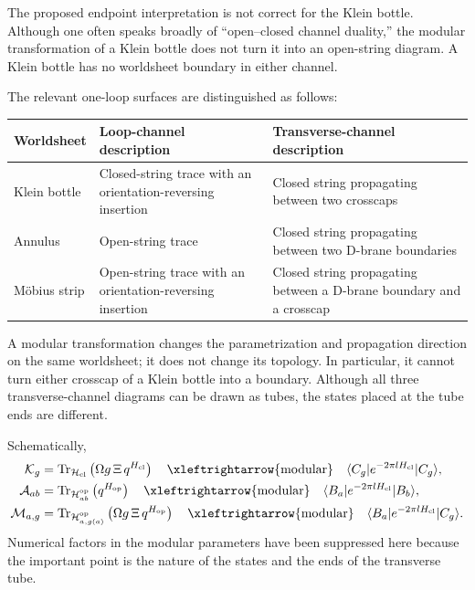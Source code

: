 \documentclass[
  10pt,
  a4paper,
  openany]{book}
\begin{document}
The proposed endpoint interpretation is not correct for the Klein
bottle. Although one often speaks broadly of ``open--closed channel
duality,'' the modular transformation of a Klein bottle does not turn it
into an open-string diagram. A Klein bottle has no worldsheet boundary
in either channel.

The relevant one-loop surfaces are distinguished as follows:

\begin{longtable}[]{@{}
  >{\raggedright\arraybackslash}p{}
  >{\raggedright\arraybackslash}p{}
  >{\raggedright\arraybackslash}p{}@{}}
\toprule\noalign{}
\begin{minipage}[b]{\linewidth}\raggedright
Worldsheet
\end{minipage} & \begin{minipage}[b]{\linewidth}\raggedright
Loop-channel description
\end{minipage} & \begin{minipage}[b]{\linewidth}\raggedright
Transverse-channel description
\end{minipage} \\
\midrule\noalign{}
\endhead
\bottomrule\noalign{}
\endlastfoot
Klein bottle & Closed-string trace with an orientation-reversing
insertion & Closed string propagating between two crosscaps \\
Annulus & Open-string trace & Closed string propagating between two
D-brane boundaries \\
Möbius strip & Open-string trace with an orientation-reversing insertion
& Closed string propagating between a D-brane boundary and a crosscap \\
\end{longtable}

A modular transformation changes the parametrization and propagation
direction on the same worldsheet; it does not change its topology. In
particular, it cannot turn either crosscap of a Klein bottle into a
boundary. Although all three transverse-channel diagrams can be drawn as
tubes, the states placed at the tube ends are different.

Schematically, \[
\begin{aligned}
\mathcal K_g
&=
\operatorname{Tr}_{\mathcal H_{\mathrm{cl}}}
\left(
\Omega g\,\Xi\,q^{H_{\mathrm{cl}}}
\right)
\quad
\xleftrightarrow{\text{modular}}
\quad
\langle C_g|
e^{-2\pi lH_{\mathrm{cl}}}
|C_g\rangle,\\
\mathcal A_{ab}
&=
\operatorname{Tr}_{\mathcal H_{ab}^{\mathrm{op}}}
\left(
q^{H_{\mathrm{op}}}
\right)
\quad
\xleftrightarrow{\text{modular}}
\quad
\langle B_a|
e^{-2\pi lH_{\mathrm{cl}}}
|B_b\rangle,\\
\mathcal M_{a,g}
&=
\operatorname{Tr}_{\mathcal H_{a,g(a)}^{\mathrm{op}}}
\left(
\Omega g\,\Xi\,q^{H_{\mathrm{op}}}
\right)
\quad
\xleftrightarrow{\text{modular}}
\quad
\langle B_a|
e^{-2\pi lH_{\mathrm{cl}}}
|C_g\rangle.
\end{aligned}
\] Numerical factors in the modular parameters have been suppressed here
because the important point is the nature of the states and the ends of
the transverse tube.
\end{document}
